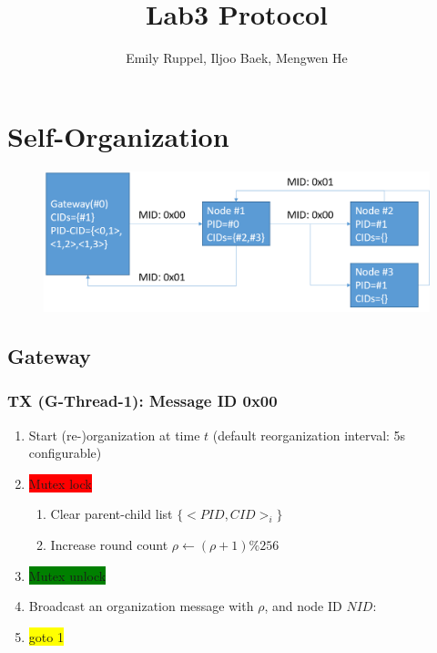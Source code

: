 \documentclass[letterpaper,10pt]{article}
\title{\textbf{Lab3 Protocol}}
\author{Emily Ruppel, Iljoo Baek, Mengwen He}
\begin{document}
\maketitle
\tableofcontents
\newpage

\section{Self-Organization}

\begin{figure}[!h]
	\centering
	\includegraphics[width=12cm]{./img/selforganization.png}
\end{figure}

\subsection{Gateway}

\subsubsection{TX (G-Thread-1): Message ID 0x00}

\begin{enumerate}
	\item Start (re-)organization at time $t$ (default reorganization interval: 5s configurable)
	\item \colorbox{red}{Mutex lock}
	\begin{enumerate}
		\item Clear parent-child list $\{<PID,CID>_i\}$
		\item Increase round count $\rho\leftarrow(\rho+1)\%256$
	\end{enumerate}	
	\item \colorbox{green}{Mutex unlock}
	\item Broadcast an organization message with $\rho$, and node ID $NID$:\\
	\item \colorbox{yellow}{goto 1}
\end{enumerate}
\end{document}
